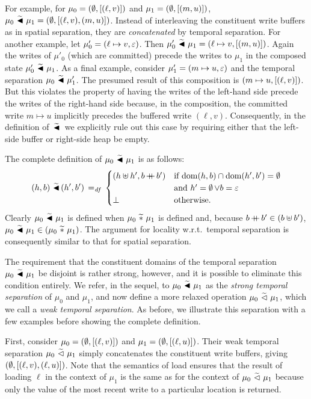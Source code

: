 \documentclass[11pt]{report}
\begin{document}
For example, for $\mu_0 = (\operatorname{\emptyset},\left[(\ell,v)\right])$ and $\mu_1 = (\operatorname{\emptyset},\left[(m,u)\right])$, $\mu_0 \operatorname{\,\widetilde{\blacktriangleleft}\,} \mu_1 = (\operatorname{\emptyset},\left[(\ell,v),(m,u)\right])$. Instead of interleaving the constituent write buffers as in spatial separation, they are \emph{concatenated} by temporal separation. For another example, let $\mu'_0 = (\ell \mapsto v, \varepsilon)$. Then $\mu'_0 \operatorname{\,\widetilde{\blacktriangleleft}\,} \mu_1 = (\ell \mapsto v, \left[(m,u)\right])$. Again the writes of $\mu'_0$ (which are committed) precede the writes to $\mu_1$ in the composed state $\mu'_0 \operatorname{\,\widetilde{\blacktriangleleft}\,} \mu_1$. As a final example, consider $\mu'_1 = (m \mapsto u, \varepsilon)$ and the temporal separation $\mu_0 \operatorname{\,\widetilde{\blacktriangleleft}\,} \mu'_1$. The presumed result of this composition is $(m \mapsto u, \left[(\ell,v)\right])$. But this violates the property of having the writes of the left-hand side precede the writes of the right-hand side because, in the composition, the committed write $m \mapsto u$ implicitly precedes the buffered write $(\ell,v)$. Consequently, in the definition of $\operatorname{\,\widetilde{\blacktriangleleft}\,}$ we explicitly rule out this case by requiring either that the left-side buffer or right-side heap be empty. 

The complete definition of $\mu_0 \operatorname{\,\widetilde{\blacktriangleleft}\,} \mu_1$ is as follows: \[ (h,b) \operatorname{\,\widetilde{\blacktriangleleft}\,} (h',b') \operatorname{\;=_{\mathit{df}}\;} \begin{cases}
  (h \uplus h', b \operatorname{+\!\!\!+} b') & \text{if $\operatorname{\mathrm{dom}}(h,b) \cap \operatorname{\mathrm{dom}}(h',b') = \operatorname{\emptyset}$} \\ & \text{and $h' = \operatorname{\emptyset} \vee b = \varepsilon$} \\
  \bot & \text{otherwise.}
\end{cases}\] Clearly $\mu_0 \operatorname{\,\widetilde{\blacktriangleleft}\,} \mu_1$ is defined when $\mu_0 \operatorname{\,\widetilde{\ast}\,} \mu_1$ is defined and, because $b \operatorname{+\!\!\!+} b' \in (b \uplus b')$, $\mu_0 \operatorname{\,\widetilde{\blacktriangleleft}\,} \mu_1 \in (\mu_0 \operatorname{\,\widetilde{\ast}\,} \mu_1)$. The argument for locality w.r.t.\ temporal separation is consequently similar to that for spatial separation. 

The requirement that the constituent domains of the temporal separation $\mu_0 \operatorname{\,\widetilde{\blacktriangleleft}\,} \mu_1$ be disjoint is rather strong, however, and it is possible to eliminate this condition entirely. We refer, in the sequel, to  $\mu_0 \operatorname{\,\widetilde{\blacktriangleleft}\,} \mu_1$ as the \emph{strong temporal separation} of $\mu_0$ and $\mu_1$, and now define a more relaxed operation $\mu_0 \operatorname{\,\widetilde{\vartriangleleft}\,} \mu_1$, which we call a \emph{weak temporal separation}. As before, we illustrate this separation with a few examples before showing the complete definition. 

First, consider $\mu_0 = (\operatorname{\emptyset},\left[(\ell,v)\right])$ and $\mu_1 = (\operatorname{\emptyset},\left[(\ell,u)\right])$. Their weak temporal separation $\mu_0 \operatorname{\,\widetilde{\vartriangleleft}\,} \mu_1$ simply concatenates the constituent write buffers, giving $(\operatorname{\emptyset},\left[(\ell,v),(\ell,u)\right])$. Note that the semantics of load ensures that the result of loading $\ell$ in the context of $\mu_1$ is the same as for the context of $\mu_0 \operatorname{\,\widetilde{\vartriangleleft}\,} \mu_1$ because only the value of the most recent write to a particular location is returned. 
\end{document}
